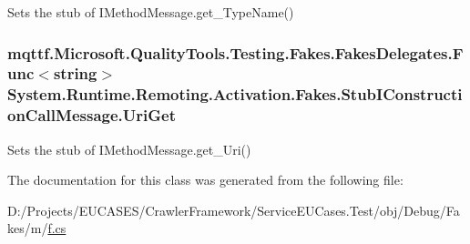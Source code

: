 Sets the stub of I\-Method\-Message.\-get\-\_\-\-Type\-Name()

\hypertarget{class_system_1_1_runtime_1_1_remoting_1_1_activation_1_1_fakes_1_1_stub_i_construction_call_message_a44127edfcb5098d6cc0f491f61b90e87}{
\subsubsection[{Uri\-Get}]{\setlength{\rightskip}{0pt plus 5cm}mqttf.\-Microsoft.\-Quality\-Tools.\-Testing.\-Fakes.\-Fakes\-Delegates.\-Func$<$string$>$ System.\-Runtime.\-Remoting.\-Activation.\-Fakes.\-Stub\-I\-Construction\-Call\-Message.\-Uri\-Get}}\label{class_system_1_1_runtime_1_1_remoting_1_1_activation_1_1_fakes_1_1_stub_i_construction_call_message_a44127edfcb5098d6cc0f491f61b90e87}


Sets the stub of I\-Method\-Message.\-get\-\_\-\-Uri()



The documentation for this class was generated from the following file\-:\begin{DoxyCompactItemize}
\item 
D\-:/\-Projects/\-E\-U\-C\-A\-S\-E\-S/\-Crawler\-Framework/\-Service\-E\-U\-Cases.\-Test/obj/\-Debug/\-Fakes/m/\hyperlink{m_2f_8cs}{f.\-cs}\end{DoxyCompactItemize}
